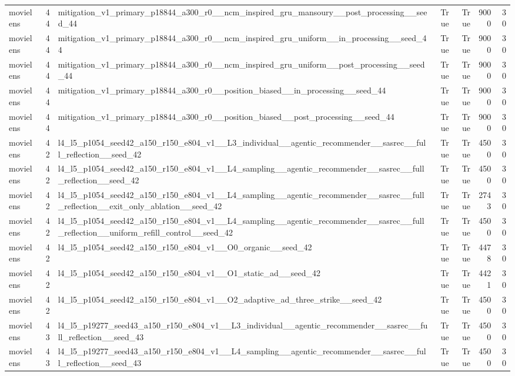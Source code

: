 \begin{table}[htbp!]
\begin{tabular}{lrlrrrr}
movielens & 44 & mitigation\_v1\_primary\_p18844\_a300\_r0\_\_ncm\_inspired\_gru\_mansoury\_\_post\_processing\_\_seed\_44 & True & True & 9000 & 30 \\
movielens & 44 & mitigation\_v1\_primary\_p18844\_a300\_r0\_\_ncm\_inspired\_gru\_uniform\_\_in\_processing\_\_seed\_44 & True & True & 9000 & 30 \\
movielens & 44 & mitigation\_v1\_primary\_p18844\_a300\_r0\_\_ncm\_inspired\_gru\_uniform\_\_post\_processing\_\_seed\_44 & True & True & 9000 & 30 \\
movielens & 44 & mitigation\_v1\_primary\_p18844\_a300\_r0\_\_position\_biased\_\_in\_processing\_\_seed\_44 & True & True & 9000 & 30 \\
movielens & 44 & mitigation\_v1\_primary\_p18844\_a300\_r0\_\_position\_biased\_\_post\_processing\_\_seed\_44 & True & True & 9000 & 30 \\
movielens & 42 & l4\_l5\_p1054\_seed42\_a150\_r150\_e804\_v1\_\_L3\_individual\_\_agentic\_recommender\_\_sasrec\_\_full\_reflection\_\_seed\_42 & True & True & 4500 & 30 \\
movielens & 42 & l4\_l5\_p1054\_seed42\_a150\_r150\_e804\_v1\_\_L4\_sampling\_\_agentic\_recommender\_\_sasrec\_\_full\_reflection\_\_seed\_42 & True & True & 4500 & 30 \\
movielens & 42 & l4\_l5\_p1054\_seed42\_a150\_r150\_e804\_v1\_\_L4\_sampling\_\_agentic\_recommender\_\_sasrec\_\_full\_reflection\_\_exit\_only\_ablation\_\_seed\_42 & True & True & 2743 & 30 \\
movielens & 42 & l4\_l5\_p1054\_seed42\_a150\_r150\_e804\_v1\_\_L4\_sampling\_\_agentic\_recommender\_\_sasrec\_\_full\_reflection\_\_uniform\_refill\_control\_\_seed\_42 & True & True & 4500 & 30 \\
movielens & 42 & l4\_l5\_p1054\_seed42\_a150\_r150\_e804\_v1\_\_O0\_organic\_\_seed\_42 & True & True & 4478 & 30 \\
movielens & 42 & l4\_l5\_p1054\_seed42\_a150\_r150\_e804\_v1\_\_O1\_static\_ad\_\_seed\_42 & True & True & 4421 & 30 \\
movielens & 42 & l4\_l5\_p1054\_seed42\_a150\_r150\_e804\_v1\_\_O2\_adaptive\_ad\_three\_strike\_\_seed\_42 & True & True & 4500 & 30 \\
movielens & 43 & l4\_l5\_p19277\_seed43\_a150\_r150\_e804\_v1\_\_L3\_individual\_\_agentic\_recommender\_\_sasrec\_\_full\_reflection\_\_seed\_43 & True & True & 4500 & 30 \\
movielens & 43 & l4\_l5\_p19277\_seed43\_a150\_r150\_e804\_v1\_\_L4\_sampling\_\_agentic\_recommender\_\_sasrec\_\_full\_reflection\_\_seed\_43 & True & True & 4500 & 30 \\

\end{tabular}
\end{table}
